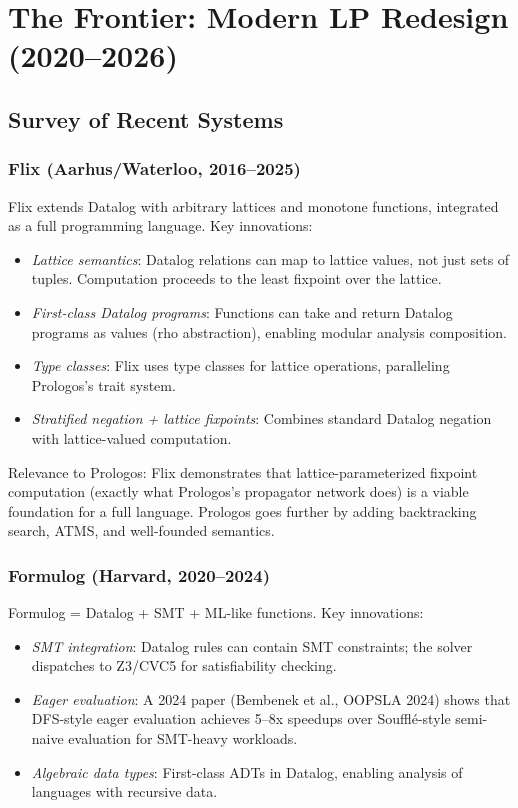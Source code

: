 \documentclass[11pt]{article}
\begin{document}
\section{The Frontier: Modern LP Redesign (2020--2026)}
\label{sec:orga65b27f}

\subsection{Survey of Recent Systems}
\label{sec:orgc185050}

\subsubsection{Flix (Aarhus/Waterloo, 2016--2025)}
\label{sec:org276f3b8}

Flix extends Datalog with arbitrary lattices and monotone functions, integrated
as a full programming language. Key innovations:

\begin{itemize}
\item \emph{Lattice semantics}: Datalog relations can map to lattice values, not just sets
of tuples. Computation proceeds to the least fixpoint over the lattice.
\item \emph{First-class Datalog programs}: Functions can take and return Datalog programs
as values (rho abstraction), enabling modular analysis composition.
\item \emph{Type classes}: Flix uses type classes for lattice operations, paralleling
Prologos's trait system.
\item \emph{Stratified negation + lattice fixpoints}: Combines standard Datalog negation
with lattice-valued computation.
\end{itemize}

Relevance to Prologos: Flix demonstrates that lattice-parameterized fixpoint
computation (exactly what Prologos's propagator network does) is a viable
foundation for a full language. Prologos goes further by adding backtracking
search, ATMS, and well-founded semantics.
\subsubsection{Formulog (Harvard, 2020--2024)}
\label{sec:orgc25c6a7}

Formulog = Datalog + SMT + ML-like functions. Key innovations:

\begin{itemize}
\item \emph{SMT integration}: Datalog rules can contain SMT constraints; the solver
dispatches to Z3/CVC5 for satisfiability checking.
\item \emph{Eager evaluation}: A 2024 paper (Bembenek et al., OOPSLA 2024) shows that
DFS-style eager evaluation achieves 5--8x speedups over Soufflé-style
semi-naive evaluation for SMT-heavy workloads.
\item \emph{Algebraic data types}: First-class ADTs in Datalog, enabling analysis of
languages with recursive data.
\end{itemize}
\end{document}
